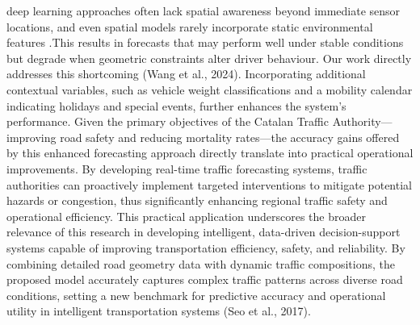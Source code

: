 \documentclass[
  letterpaper,
  DIV=11,
  numbers=noendperiod]{scrartcl}
\begin{document}
deep learning approaches often lack spatial awareness beyond immediate
sensor locations, and even spatial models rarely incorporate static
environmental features .This results in forecasts that may perform well
under stable conditions but degrade when geometric constraints alter
driver behaviour. Our work directly addresses this shortcoming (Wang et
al., 2024). Incorporating additional contextual variables, such as
vehicle weight classifications and a mobility calendar indicating
holidays and special events, further enhances the system's performance.
Given the primary objectives of the Catalan Traffic
Authority---improving road safety and reducing mortality rates---the
accuracy gains offered by this enhanced forecasting approach directly
translate into practical operational improvements. By developing
real-time traffic forecasting systems, traffic authorities can
proactively implement targeted interventions to mitigate potential
hazards or congestion, thus significantly enhancing regional traffic
safety and operational efficiency. This practical application
underscores the broader relevance of this research in developing
intelligent, data-driven decision-support systems capable of improving
transportation efficiency, safety, and reliability. By combining
detailed road geometry data with dynamic traffic compositions, the
proposed model accurately captures complex traffic patterns across
diverse road conditions, setting a new benchmark for predictive accuracy
and operational utility in intelligent transportation systems (Seo et
al., 2017).
\end{document}

